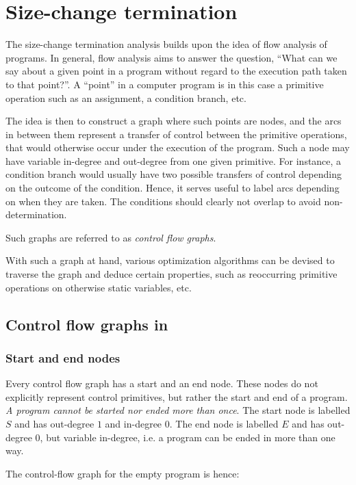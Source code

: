 \chapter{Size-change termination}

The size-change termination analysis builds upon the idea of flow analysis of
programs. In general, flow analysis aims to answer the question, ``What can we
say about a given point in a program without regard to the execution path taken
to that point?''. A ``point'' in a computer program is in this case a primitive
operation such as an assignment, a condition branch, etc.

The idea is then to construct a graph where such points are nodes, and the arcs
in between them represent a transfer of control between the primitive
operations, that would otherwise occur under the execution of the program.
Such a node may have variable in-degree and out-degree from one given
primitive. For instance, a condition branch would usually have two possible
transfers of control depending on the outcome of the condition. Hence, it
serves useful to label arcs depending on when they are taken. The conditions
should clearly not overlap to avoid non-determination.

Such graphs are referred to as \emph{control flow graphs}.

With such a graph at hand, various optimization algorithms can be devised to
traverse the graph and deduce certain properties, such as reoccurring primitive
operations on otherwise static variables\cite{kildall}, etc.

\section{Control flow graphs in \D{}}

\subsection{Start and end nodes}

Every control flow graph has a start and an end node. These nodes do not
explicitly represent control primitives, but rather the start and end of a
program. \emph{A program cannot be started nor ended more than once}. The start
node is labelled $S$ and has out-degree $1$ and in-degree $0$. The end node is
labelled $E$ and has out-degree $0$, but variable in-degree, i.e. a program can
be ended in more than one way.

The control-flow graph for the empty program is hence:

